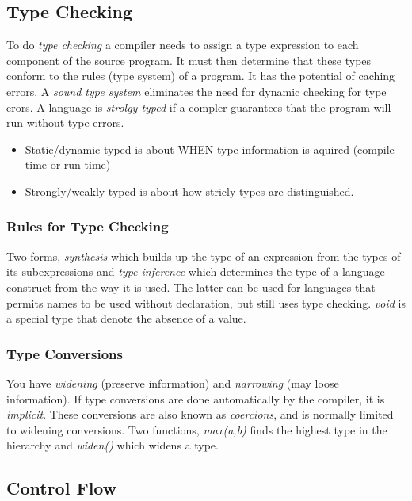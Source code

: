 \documentclass{article}
\begin{document}
\subsection{Type Checking} %
\label{sub:Type Checking}
To do \emph{type checking} a compiler needs to assign a type expression to each component of the source program. It must then determine that these types conform to the rules (type system) of a program. It has the potential of caching errors. A \emph{sound type system} eliminates the need for dynamic checking for type erors. A language is \emph{strolgy typed} if a compler guarantees that the program will run without type errors.
\begin{itemize}
	\item Static/dynamic typed is about WHEN type information is aquired (compile-time or run-time)
	\item Strongly/weakly typed is about how stricly types are distinguished.
\end{itemize}
\subsubsection{Rules for Type Checking} %
\label{ssub:Rules for Type Checking}
Two forms, \emph{synthesis} which builds up the type of an expression from the types of its subexpressions and \emph{type inference} which determines the type of a language construct from the way it is used. The latter can be used for languages that permits names to be used without declaration, but still uses type checking. \emph{void} is a special type that denote the absence of a value.
\subsubsection{Type Conversions} %
\label{ssub:Type Conversions}
You have \emph{widening} (preserve information) and \emph{narrowing} (may loose information). If type conversions are done automatically by the compiler, it is \emph{implicit}. These conversions are also known as \emph{coercions}, and is normally limited to widening conversions. Two functions, \emph{max(a,b)} finds the highest type in the hierarchy and \emph{widen()} which widens a type.


\subsection{Control Flow} %
\label{sub:Control Flow}
\end{document}
